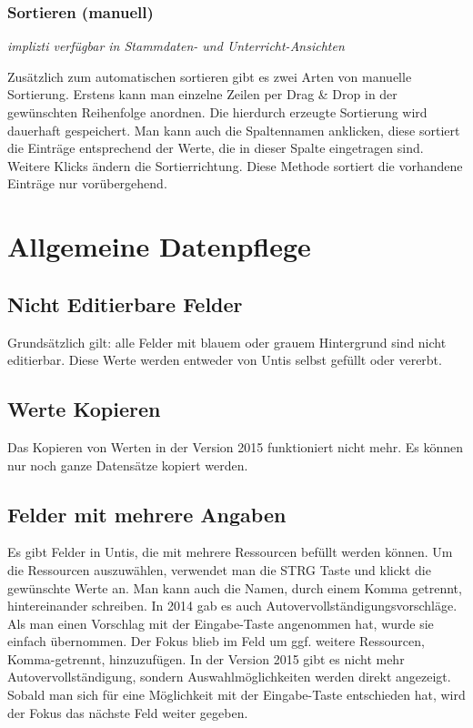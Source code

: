 \subsubsection{Sortieren (manuell)}
{\small\textit{implizti verfügbar in Stammdaten- und Unterricht-Ansichten\\}\par}

\noindent
Zusätzlich zum automatischen sortieren gibt es zwei Arten von manuelle Sortierung. Erstens kann man einzelne Zeilen per Drag \& Drop in der gewünschten Reihenfolge anordnen. Die hierdurch erzeugte Sortierung wird dauerhaft gespeichert. Man kann auch die Spaltennamen anklicken, diese sortiert die Einträge entsprechend der Werte, die in dieser Spalte eingetragen sind. Weitere Klicks ändern die Sortierrichtung. Diese Methode sortiert die vorhandene Einträge nur vorübergehend.

\section{Allgemeine Datenpflege}

\subsection{Nicht Editierbare Felder}
\label{sec:nicht-editierbar}

Grundsätzlich gilt: alle Felder mit blauem oder grauem Hintergrund sind nicht editierbar. Diese Werte werden entweder von Untis selbst gefüllt oder vererbt.

\subsection{Werte Kopieren}
\label{sec:werte-kopierung}

Das Kopieren von Werten in der Version 2015 funktioniert nicht mehr. Es können nur noch ganze Datensätze kopiert werden.

\subsection{Felder mit mehrere Angaben}
\label{sec:mehrfache-angaben}

Es gibt Felder in Untis, die mit mehrere Ressourcen befüllt werden können. Um die Ressourcen auszuwählen, verwendet man die STRG Taste und klickt die gewünschte Werte an. Man kann auch die Namen, durch einem Komma getrennt, hintereinander schreiben. In 2014 gab es auch Autovervollständigungsvorschläge. Als man einen Vorschlag mit der Eingabe-Taste angenommen hat, wurde sie einfach übernommen. Der Fokus blieb im Feld um ggf. weitere Ressourcen, Komma-getrennt, hinzuzufügen. In der Version 2015 gibt es nicht mehr Autovervollständigung, sondern Auswahlmöglichkeiten werden direkt angezeigt. Sobald man sich für eine Möglichkeit mit der Eingabe-Taste entschieden hat, wird der Fokus das nächste Feld weiter gegeben.

